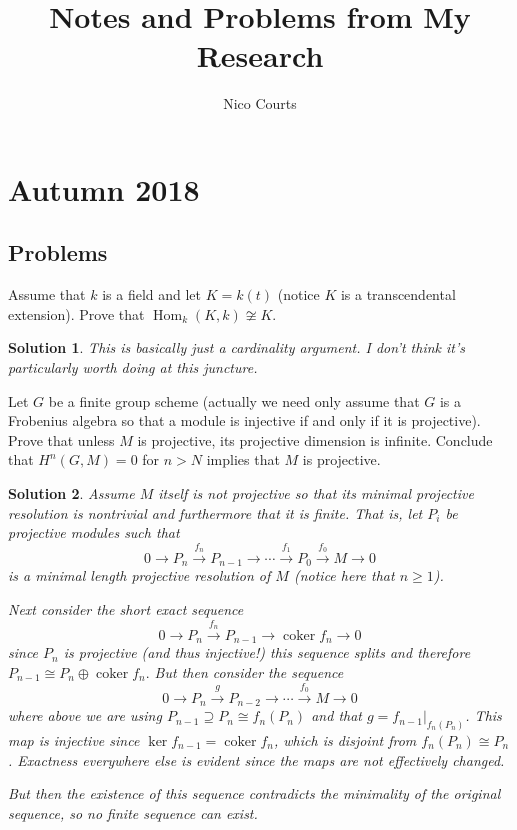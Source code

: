 \documentclass[12pt]{article}
\theoremstyle{nonumberbreak}
\newtheorem{sol}{Solution}
\theoremstyle{changebreak}
\theoremstyle{nonumberbreak}
\DeclareMathOperator{\Hom}{Hom}
\DeclareMathOperator{\coker}{coker}
\begin{document}
\title{Notes and Problems from My Research\vspace{-1ex}}
\author{Nico Courts}
\date{}
\maketitle


\section{Autumn 2018}
\subsection{Problems}
\begin{prob}
	Assume that $k$ is a field and let $K=k(t)$ (notice $K$ is a transcendental extension). Prove that $\Hom_k(K,k)\not\cong K$.
\end{prob}

\begin{sol}
	This is basically just a cardinality argument. I don't think it's particularly worth doing at this juncture.
\end{sol}

\begin{prob}
	Let $G$ be a finite group scheme (actually we need only assume that $G$ is a Frobenius algebra so that a module
	is injective if and only if it is projective). Prove that unless $M$ is projective, its projective dimension is 
	infinite. Conclude that $H^n(G,M)=0$ for $n>N$ implies that $M$ is projective.
\end{prob}
\begin{sol}
	Assume $M$ itself is not projective so that its minimal projective resolution is nontrivial and furthermore
	that it is finite. That is, let $P_i$ be projective modules such that
	\[0\to P_n\xrightarrow{f_n} P_{n-1}\to\cdots \xrightarrow{f_{1}}P_0\xrightarrow{f_0} M\to 0\]
	is a minimal length projective resolution of $M$ (notice here that $n\ge 1$). 
	
	Next consider the short exact sequence
	\[0\to P_n\xrightarrow{f_n}P_{n-1}\to \coker f_n\to 0\]
	since $P_n$ is projective (and thus injective!) this sequence splits and therefore $P_{n-1}\cong P_n\oplus\coker f_n.$
	But then consider the sequence
	\[0\to P_n\xrightarrow{g} P_{n-2}\to\cdots\xrightarrow{f_0}M\to 0\]
	where above we are using $P_{n-1}\supseteq P_n\cong f_n(P_n)$  and that
	$g=f_{n-1}|_{f_n(P_n)}$. This map is injective since $\ker f_{n-1}=\coker f_n$, which is disjoint
	from $f_n(P_n)\cong P_n$. Exactness everywhere else is evident since the maps are not effectively changed.

	But then the existence of this sequence contradicts the minimality of the original sequence, so
	no finite sequence can exist.
\end{sol}
\end{document}
